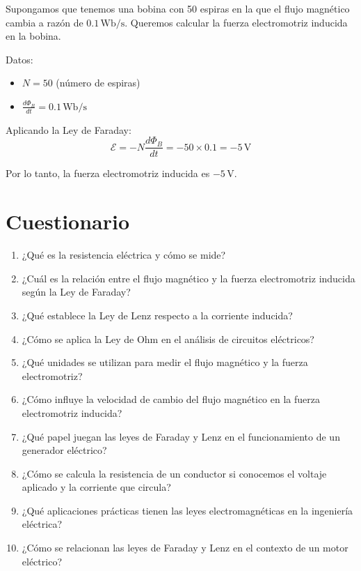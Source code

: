 \documentclass[../main]{subfiles}
\begin{document}
Supongamos que tenemos una bobina con 50 espiras en la que el flujo magnético cambia a razón de \(0.1 \, \text{Wb/s}\). Queremos calcular la fuerza electromotriz inducida en la bobina.

Datos:
\begin{itemize}
    \item \(N = 50\) (número de espiras)
    \item \(\frac{d\Phi_B}{dt} = 0.1 \, \text{Wb/s}\)
\end{itemize}

Aplicando la Ley de Faraday:
\begin{equation}
\mathcal{E} = -N \frac{d\Phi_B}{dt} = -50 \times 0.1 = -5 \, \text{V}
\end{equation}

Por lo tanto, la fuerza electromotriz inducida es \(-5 \, \text{V}\).

\section{Cuestionario}

\begin{enumerate}
    \item ¿Qué es la resistencia eléctrica y cómo se mide?
    \item ¿Cuál es la relación entre el flujo magnético y la fuerza electromotriz inducida según la Ley de Faraday?
    \item ¿Qué establece la Ley de Lenz respecto a la corriente inducida?
    \item ¿Cómo se aplica la Ley de Ohm en el análisis de circuitos eléctricos?
    \item ¿Qué unidades se utilizan para medir el flujo magnético y la fuerza electromotriz?
    \item ¿Cómo influye la velocidad de cambio del flujo magnético en la fuerza electromotriz inducida?
    \item ¿Qué papel juegan las leyes de Faraday y Lenz en el funcionamiento de un generador eléctrico?
    \item ¿Cómo se calcula la resistencia de un conductor si conocemos el voltaje aplicado y la corriente que circula?
    \item ¿Qué aplicaciones prácticas tienen las leyes electromagnéticas en la ingeniería eléctrica?
    \item ¿Cómo se relacionan las leyes de Faraday y Lenz en el contexto de un motor eléctrico?
\end{enumerate}
\end{document}
